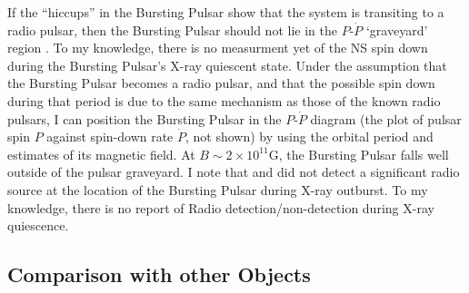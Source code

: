 \par If the ``hiccups'' in the Bursting Pulsar show that the system is transiting to a radio pulsar, then the Bursting Pulsar should not lie in the $P$-$\dot{P}$ `graveyard' region \citep[e.g.][]{vandenHeuvel_Graveyard}. To my knowledge, there is no measurment yet of the NS spin down during the Bursting Pulsar's X-ray quiescent state. Under the assumption that the Bursting Pulsar becomes a radio pulsar, and that the possible spin down during that period is due to the same mechanism as those of the known radio pulsars, I can position the Bursting Pulsar in the $P$-$\dot{P}$ diagram (the plot of pulsar spin $P$ against spin-down rate $\dot{P}$, not shown) by using the orbital period and estimates of its magnetic field. At $B\sim2\times10^{11}$G, the Bursting Pulsar falls well outside of the pulsar graveyard. I note that \citet{Pandey-Pommier_BPRad} and \citet{Russell_BPRad} did not detect a significant radio source at the location of the Bursting Pulsar during X-ray outburst. To my knowledge, there is no report of Radio detection/non-detection during X-ray quiescence.

\subsection{Comparison with other Objects}

%
%

